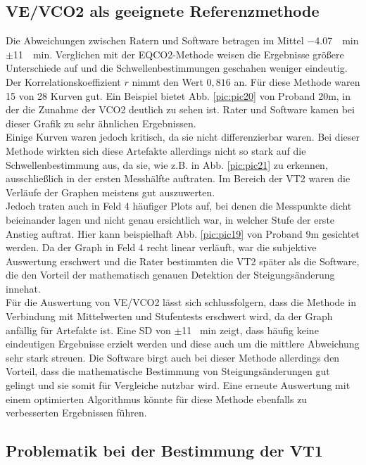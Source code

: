 \subsection{\acrshort{VE}/\acrshort{VCO2} als geeignete Referenzmethode}
%
Die Abweichungen zwischen Ratern und Software betragen im Mittel \SI{-4,07}{\per\minute} $\pm$\SI{11}{\per\minute}. Verglichen mit der \gls{EQCO2}-Methode weisen die Ergebnisse größere Unterschiede auf und die Schwellenbestimmungen geschahen weniger eindeutig. Der Korrelationskoeffizient $r$ nimmt den Wert $0,816$ an. Für diese Methode waren 15 von 28 Kurven gut. Ein Beispiel bietet Abb. \ref{pic:pic20} von Proband 20m, in der die Zunahme der \gls{VCO2} deutlich zu sehen ist. Rater und Software kamen bei dieser Grafik zu sehr ähnlichen Ergebnissen.\\
Einige Kurven waren jedoch kritisch, da sie nicht differenzierbar waren. Bei dieser Methode wirkten sich diese Artefakte allerdings nicht so stark auf die Schwellenbestimmung aus, da sie, wie z.B. in Abb. \ref{pic:pic21} zu erkennen, ausschließlich in der ersten Messhälfte auftraten. Im Bereich der VT2 waren die Verläufe der Graphen meistens gut auszuwerten.\\
Jedoch traten auch in Feld 4 häufiger Plots auf, bei denen die Messpunkte dicht beieinander lagen und nicht genau ersichtlich war, in welcher Stufe der erste Anstieg auftrat. Hier kann beispielhaft Abb. \ref{pic:pic19} von Proband 9m gesichtet werden. Da der Graph in Feld 4 recht linear verläuft, war die subjektive Auswertung erschwert und die Rater bestimmten die VT2 später als die Software, die den Vorteil der mathematisch genauen Detektion der Steigungsänderung innehat.\\
Für die Auswertung von \gls{VE}/\gls{VCO2} lässt sich schlussfolgern, dass die Methode in Verbindung mit Mittelwerten und Stufentests erschwert wird, da der Graph anfällig für Artefakte ist. Eine \gls{SD} von $\pm$11 \si{\per\minute} zeigt, dass häufig keine eindeutigen Ergebnisse erzielt werden und diese auch um die mittlere Abweichung sehr stark streuen. Die Software birgt auch bei dieser Methode allerdings den Vorteil, dass die mathematische Bestimmung von Steigungsänderungen gut gelingt und sie somit für Vergleiche nutzbar wird. Eine erneute Auswertung mit einem optimierten Algorithmus könnte für diese Methode ebenfalls zu verbesserten Ergebnissen führen.
%
\subsection{Problematik bei der Bestimmung der VT1}
%
